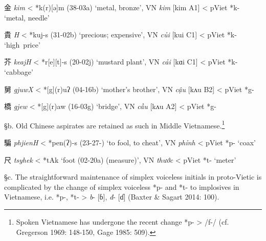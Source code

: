 \begin{description} \item
金 \emph{kim} \textless{} *k(r){[}ə]m (38-03a) `metal, bronze', VN
 \emph{kim} {[}kim A1] \textless{} pViet *k- `metal, needle'

\item
貴 \emph{{}H} \textless{} *kuj-s (31-02b) `precious; expensive', VN
 \emph{củi} {[}kui C1] \textless{} pViet *k- `high~price'

\item
芥  \emph{keajH} \textless{} *{}r{[}e]{[}t]-s (20-02j) `mustard
plant', VN \emph{cải} {[}kɑi C1] \textless{} pViet *k- `cabbage'

\item
舅  \emph{gjuwX} \textless{} *[g](r)uʔ (04-16b) `mother's brother',
VN \emph{cậu} {[}kʌu B2] \textless{} pViet *g-

\item
橋  \emph{gjew} \textless{} *[g](r)aw (16-03g) `bridge', VN
 \emph{cầu} {[}kʌu A2] \textless{} pViet *g-
\end{description}

§b. Old Chinese aspirates are retained as such in Middle
Vietnamese.\footnote{Spoken Vietnamese has undergone the recent change
  *p{}- \textgreater{} /f-/ (cf. Gregerson 1969: 148-150, Gage 1985:
  509).}

\begin{description} \item
騙  \emph{phjienH} \textless{} *p{}en(ʔ)-s (23-27-) `to fool, to cheat',
VN \emph{phỉnh} \textless{} pViet *p{}- `coax'
\item
尺  \emph{tsyhek} \textless{} *t{}Ak `foot (02-20a) (measure)', VN
 \emph{thước} \textless{} pViet *t{}- `meter'
\end{description}

§c. The straightforward maintenance of simplex voiceless initials in
proto-Vietic is com­plicated by the change of simplex voiceless *p- and
*t- to implosives in Vietnamese, i.e. *p-, *t- \textgreater{} \emph{b}-
{[}ɓ],  \emph{đ}- {[}ɗ] (Baxter \& Sagart 2014: 100).

